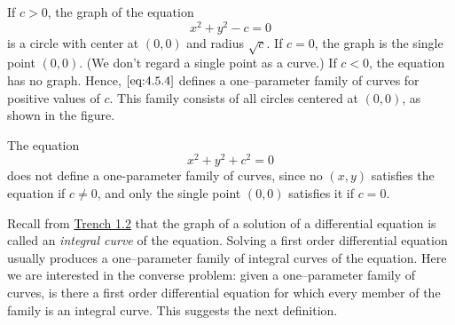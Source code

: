 \documentclass{ximera}
\begin{document}
 
 
\begin{example}\label{example:4.5.3}
If $c>0$,  the graph of the equation
\begin{equation} \label{eq:4.5.4}
x^2+y^2-c=0
\end{equation}
is a circle with center at $(0,0)$ and radius $\sqrt{c}$. If $c=0$, the
graph is the single point $(0,0)$. (We don't regard a single point as
a curve.) If $c<0$, the equation has no graph. Hence, $\eqref{eq:4.5.4}$
defines a one--parameter family of curves for positive values of $c$.
This family consists of all circles centered at $(0,0)$, as shown in the figure.

\begin{center}
\end{center}
 
 
\end{example}
 
\begin{example}\label{example:4.5.4}
 The equation
$$
x^2+y^2+c^2=0
$$
does not define a one-parameter family of curves, since no $(x,y)$
satisfies the equation if $c\neq 0$, and only the single point $(0,0)$
satisfies it if $c=0$.
\end{example}
 
Recall from \href{https://xerxes.ximera.org/differentialequations/main/basicConcepts/basicConcepts}{Trench 1.2} that the graph of a solution of a
differential equation is called an \textit{integral curve} of the
equation. Solving a first order differential equation usually produces
a one--parameter family of integral curves of the equation. Here we
are interested in the converse problem:
given a one--parameter family of curves, is there a first order
differential equation for which every  member of the family is an integral
curve.
This suggests the next definition.
 
\end{document}
